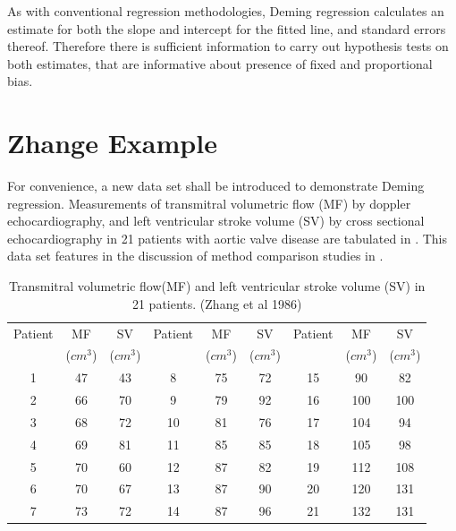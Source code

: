 \documentclass[12pt, a4paper]{report}
\theoremstyle{plain}
\theoremstyle{definition}
\theoremstyle{remark}
\begin{document}
As with conventional regression methodologies, Deming regression calculates an estimate for both the slope and intercept for the
fitted line, and standard errors thereof. Therefore there is sufficient information to carry out hypothesis tests on both
estimates, that are informative about presence of fixed and proportional bias.





\section{Zhange Example}
For convenience, a new data set shall be introduced to demonstrate Deming regression. Measurements of transmitral volumetric flow (MF) by doppler echocardiography, and left ventricular stroke volume (SV) by cross sectional echocardiography in 21 patients
with aortic valve disease are tabulated in \citet{zhang}. This data 
set features in the discussion of method comparison studies
in \citet[p.398]{AltmanBook} .



\begin{table}[h!]
	\begin{center}
		\begin{tabular}{|c|c|c||c|c|c||c|c|c|}
			\hline
			Patient & MF  & SV  & Patient & MF  & SV  & Patient & MF  & SV \\
			&($cm^{3}$)&  ($cm^{3}$) & &($cm^{3}$)&  ($cm^{3}$) & &($cm^{3}$)&  ($cm^{3}$)
			\\
			\hline
			1 & 47 & 43 &  8 & 75 & 72 &  15 & 90 & 82 \\
			2 & 66 & 70 & 9 & 79 & 92 &  16 & 100 & 100 \\
			3 & 68 & 72 & 10 & 81 & 76 & 17 & 104 & 94 \\
			4 & 69 & 81 & 11 & 85 & 85 &  18 & 105 & 98 \\
			5 & 70 & 60 & 12 & 87 & 82 & 19 & 112 & 108 \\
			6 & 70 & 67 & 13 & 87 & 90 & 20 & 120 & 131 \\
			7 & 73 & 72 & 14 & 87 & 96 &  21 & 132 & 131 \\
			
			\hline
		\end{tabular}
		\caption{Transmitral volumetric flow(MF) and left ventricular
			stroke volume (SV) in 21 patients. (Zhang et al 1986)}
	\end{center}
\end{table}
\end{document}
